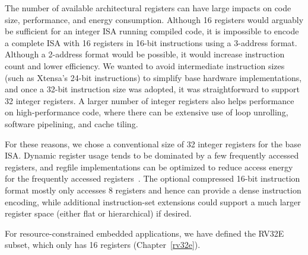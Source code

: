 \begin{commentary}
The number of available architectural registers can have large impacts
on code size, performance, and energy consumption.  Although 16
registers would arguably be sufficient for an integer ISA running
compiled code, it is impossible to encode a complete ISA with 16
registers in 16-bit instructions using a 3-address format.  Although a
2-address format would be possible, it would increase instruction
count and lower efficiency.  We wanted to avoid intermediate
instruction sizes (such as Xtensa's 24-bit instructions) to simplify
base hardware implementations, and once a 32-bit instruction size was
adopted, it was straightforward to support 32 integer registers.  A
larger number of integer registers also helps performance on
high-performance code, where there can be extensive use of loop
unrolling, software pipelining, and cache tiling.

For these reasons, we chose a conventional size of 32 integer
registers for the base ISA.  Dynamic register usage tends to be
dominated by a few frequently accessed registers, and regfile
implementations can be optimized to reduce access energy for the
frequently accessed registers~\cite{jtseng:sbbci}.  The optional
compressed 16-bit instruction format mostly only accesses 8 registers
and hence can provide a dense instruction encoding, while additional
instruction-set extensions could support a much larger register space
(either flat or hierarchical) if desired.

For resource-constrained embedded applications, we have defined the
RV32E subset, which only has 16 registers (Chapter~\ref{rv32e}).
\end{commentary}


